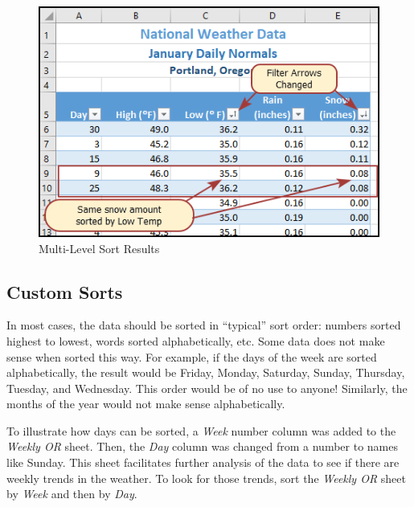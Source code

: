 \begin{figure}[H]
	\centering
	\includegraphics[width=\maxwidth{.95\linewidth}]{gfx/ch05_fig12}
	\caption{Multi-Level Sort Results}
	\label{05:fig12}
\end{figure}

\subsection{Custom Sorts}

In most cases, the data should be sorted in ``typical'' sort order: numbers sorted highest to lowest, words sorted alphabetically, etc. Some data does not make sense when sorted this way. For example, if the days of the week are sorted alphabetically, the result would be Friday, Monday, Saturday, Sunday, Thursday, Tuesday, and Wednesday. This order would be of no use to anyone! Similarly, the months of the year would not make sense alphabetically.

To illustrate how days can be sorted, a \textit{Week} number column was added to the \textit{Weekly OR} sheet. Then, the \textit{Day} column was changed from a number to names like Sunday. This sheet facilitates further analysis of the data to see if there are weekly trends in the weather. To look for those trends, sort the \textit{Weekly OR} sheet by \textit{Week} and then by \textit{Day}.

